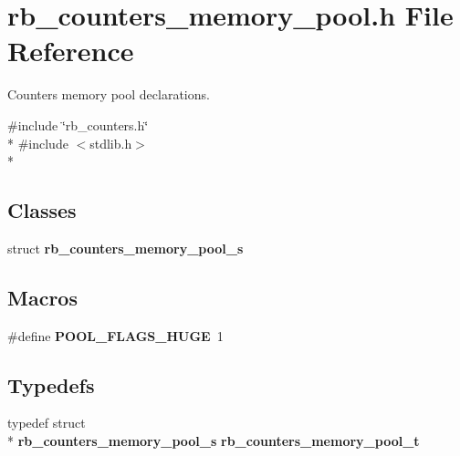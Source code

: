 \section{rb\+\_\+counters\+\_\+memory\+\_\+pool.\+h File Reference}
\label{rb__counters__memory__pool_8h}


Counters memory pool declarations.  


{\ttfamily \#include \char`\"{}rb\+\_\+counters.\+h\char`\"{}}\\*
{\ttfamily \#include $<$stdlib.\+h$>$}\\*
\subsection*{Classes}
\begin{DoxyCompactItemize}
\item 
struct {\bf rb\+\_\+counters\+\_\+memory\+\_\+pool\+\_\+s}
\end{DoxyCompactItemize}
\subsection*{Macros}
\begin{DoxyCompactItemize}
\item 
\#define {\bf P\+O\+O\+L\+\_\+\+F\+L\+A\+G\+S\+\_\+\+H\+U\+G\+E}~1
\end{DoxyCompactItemize}
\subsection*{Typedefs}
\begin{DoxyCompactItemize}
\item 
typedef struct \\*
{\bf rb\+\_\+counters\+\_\+memory\+\_\+pool\+\_\+s} {\bf rb\+\_\+counters\+\_\+memory\+\_\+pool\+\_\+t}
\end{DoxyCompactItemize}
